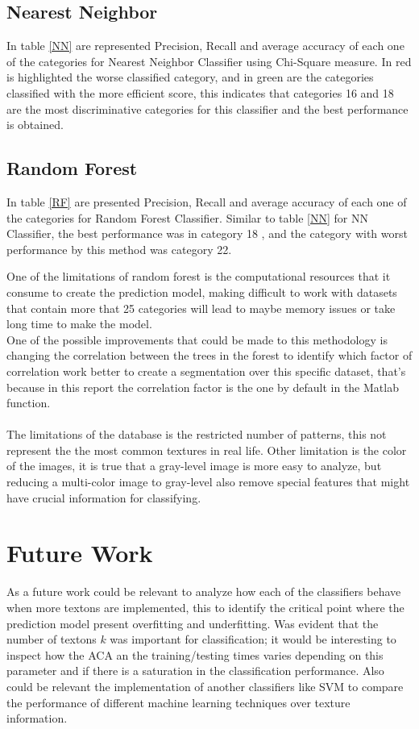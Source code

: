 \documentclass[10pt,twocolumn,letterpaper]{article}
\begin{document}
\subsection{Nearest Neighbor}
In  table \ref{NN} are represented Precision, Recall and average accuracy of each one of the categories for Nearest Neighbor Classifier using Chi-Square measure. In red is highlighted the worse classified category, and in green are the categories classified with the more efficient score, this indicates that categories 16 and 18 are the most discriminative categories for this classifier and the best performance is obtained.

\subsection{Random Forest}
In  table \ref{RF} are presented Precision, Recall and average accuracy of each one of the categories for Random Forest Classifier. Similar to table \ref{NN} for NN Classifier, the best performance was in category 18 , and the category with worst performance by this method was category 22.

One of the limitations of random forest is the computational resources that it consume to create the prediction model, making difficult to work with datasets that contain more that 25 categories will lead to maybe memory issues or take long time to make the model.\\
One of the possible improvements that could be made to this methodology is changing the correlation between the trees in the forest to identify which factor of correlation work better to create a segmentation over this specific dataset, that's because in this report the correlation factor is the one by default in the Matlab function.
\\
\\

The limitations of the database is the restricted number of patterns, this not represent the the most common textures in real life. Other limitation is the color of the images, it is true that a gray-level image is more easy to analyze, but reducing a multi-color image to gray-level also remove special features that might have crucial information for classifying.

\section{Future Work}
As a future work could be relevant to analyze how each of the classifiers behave when more textons are implemented, this to identify the critical point where the prediction model present overfitting and underfitting. Was evident that the number of textons $k$ was important for classification; it would be interesting to inspect how the ACA an the training/testing times varies depending on this parameter and if there is a saturation in the classification performance. Also could be relevant the implementation of another classifiers like SVM to compare the performance of different machine learning techniques over texture information. 
{\small


}
\end{document}

